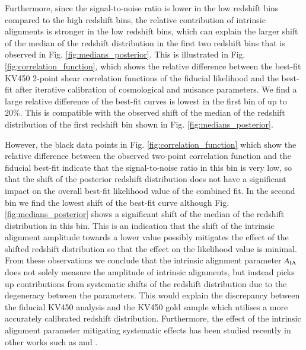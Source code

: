 \documentclass{aa}
\begin{document}
Furthermore, since the signal-to-noise ratio is lower in the low redshift bins compared to the high redshift bins, the relative contribution of intrinsic alignments is stronger in the low redshift bins, which can explain the larger shift of the median of the redshift distribution in the first two redshift bins that is observed in Fig. \ref{fig:medians_posterior}. This is illustrated in Fig. \ref{fig:correlation_function}, which shows the relative difference between the best-fit KV450 2-point shear correlation functions of the fiducial likelihood and the best-fit after iterative calibration of cosmological and nuisance parameters. We find a large relative difference of the best-fit curves is lowest in the first bin of up to $20 \%$. This is compatible with the observed shift of the median of the redshift distribution of the first redshift bin shown in Fig. \ref{fig:medians_posterior}. 

However, the black data points in Fig. \ref{fig:correlation_function} which show the relative difference between the observed two-point correlation function and the fiducial best-fit indicate that the signal-to-noise ratio in this bin is very low, so that the shift of the posterior redshift distribution does not have a significant impact on the overall best-fit likelihood value of the combined fit. In the second bin we find the lowest shift of the best-fit curve although Fig. \ref{fig:medians_posterior} shows a significant shift of the median of the redshift distribution in this bin. This is an indication that the shift of the intrinsic alignment amplitude towards a lower value possibly mitigates the effect of the shifted redshift distribution so that the effect on the likelihood value is minimal. From these observations we conclude that the intrinsic alignment parameter $A_{\rm IA}$ does not solely measure the amplitude of intrinsic alignments, but instead picks up contributions from systematic shifts of the redshift distribution due to the degeneracy between the parameters. This would explain the discrepancy between the fiducial KV450 analysis and the KV450 gold sample which utilises a more accurately calibrated redshift distribution. Furthermore, the effect of the intrinsic alignment parameter mitigating systematic effects has been studied recently in other works such as \cite{vanUitert18} and \cite{Efstathiou18}.
\end{document}
